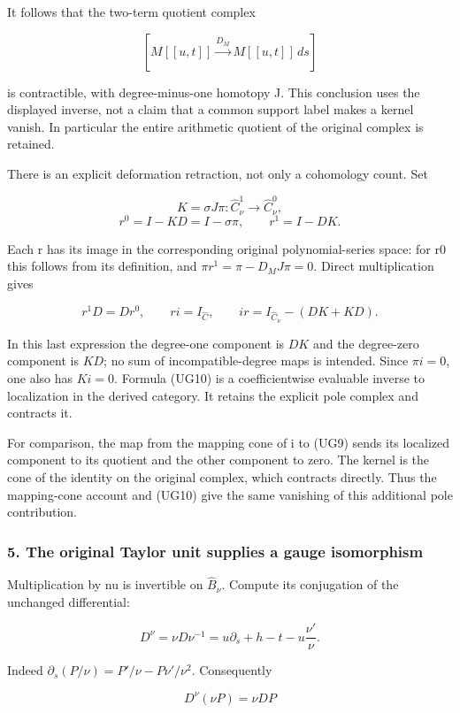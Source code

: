 \documentclass{article}
\begin{document}
It follows that the two-term quotient complex

\[
[M[[u,t]]\xrightarrow{D_M}M[[u,t]]\,ds]
\tag{UG9}
\]

is contractible, with degree-minus-one homotopy J. This conclusion uses the displayed inverse, not a claim that a common support label makes a kernel vanish. In particular the entire arithmetic quotient of the original complex is retained.

There is an explicit deformation retraction, not only a cohomology count. Set

\[
K=\sigma J\pi:\widehat C_\nu^1\longrightarrow\widehat C_\nu^0,
\] \[
r^0=I-KD=I-\sigma\pi,\qquad r^1=I-DK.
\tag{UG10}
\]

Each r has its image in the corresponding original polynomial-series space: for r0 this follows from its definition, and \(\pi r^1=\pi-D_M J\pi=0\). Direct multiplication gives

\[
r^1D=Dr^0,\qquad ri=I_{\widehat C},\qquad
ir=I_{\widehat C_\nu}-(DK+KD).
\tag{UG11}
\]

In this last expression the degree-one component is \(DK\) and the degree-zero component is \(KD\); no sum of incompatible-degree maps is intended. Since \(\pi i=0\), one also has \(Ki=0\). Formula (UG10) is a coefficientwise evaluable inverse to localization in the derived category. It retains the explicit pole complex and contracts it.

For comparison, the map from the mapping cone of i to (UG9) sends its localized component to its quotient and the other component to zero. The kernel is the cone of the identity on the original complex, which contracts directly. Thus the mapping-cone account and (UG10) give the same vanishing of this additional pole contribution.

\subsubsection{5. The original Taylor unit supplies a gauge isomorphism}\label{endpoint-f1_unit_gauge--the-original-taylor-unit-supplies-a-gauge-isomorphism}

Multiplication by nu is invertible on \(\widehat B_\nu\). Compute its conjugation of the unchanged differential:

\[
\boxed{D^{\nu}=\nu D\nu^{-1}
=u\partial_s+h-t-u\frac{\nu'}{\nu}.}
\tag{UG12}
\]

Indeed \(\partial_s(P/\nu)=P'/\nu-P\nu'/\nu^2\). Consequently

\[
D^{\nu}(\nu P)=\nu DP
\]
\end{document}

